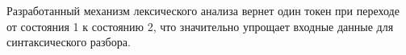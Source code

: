 \documentclass[10pt, conference, compsocconf]{IEEEtran}
\begin{document}
Разработанный механизм лексического анализа вернет один токен при переходе от состояния 1 к  состоянию 2, что значительно упрощает входные данные для синтаксического разбора.

%
%



%
%
\end{document}
